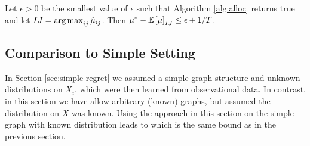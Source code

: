 \begin{theorem}\label{thm:general-upper}
Let $\epsilon > 0$ be the smallest value of $\epsilon$ such that Algorithm \ref{alg:alloc} returns true and let $IJ = \argmax_{ij} \hat \mu_{ij}$.
Then $\mu^* - \mathbb E\left[\mu\right]_{IJ} \leq \epsilon + 1/T$.
\end{theorem}


\subsection*{Comparison to Simple Setting}

In Section \ref{sec:simple-regret} we assumed a simple graph structure and unknown distributions on $X_i$, which were then learned from observational
data. In contrast, in this section we have allow arbitrary (known) graphs, but assumed the distribution on $X$ was known. 
Using the approach in this section on the simple graph with known distribution leads to 
which is the same bound as in the previous section. 






